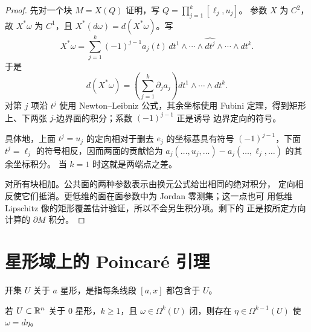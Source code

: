 \begin{proof}
先对一个块 $M=X(Q)$ 证明，写 $Q=\prod_{j=1}^k[\ell_j,u_j]$。
参数 $X$ 为 $C^2$，故 $X^*\omega$ 为
$C^1$，且 $X^*(d\omega)=d(X^*\omega)$。写
\[
 X^*\omega=\sum_{j=1}^k(-1)^{j-1}a_j(t)\,
 dt^1\wedge\cdots\wedge\widehat{dt^j}\wedge\cdots\wedge dt^k.
\]
于是
\[
 d(X^*\omega)=\left(\sum_{j=1}^k\partial_ja_j\right)
 dt^1\wedge\cdots\wedge dt^k.
\]
对第 $j$ 项沿 $t^j$ 使用 Newton--Leibniz 公式，其余坐标使用 Fubini
定理，得到矩形上、下两张 $j$-边界面的积分；系数 $(-1)^{j-1}$ 正是诱导
边界定向的符号。

具体地，上面 $t^j=u_j$ 的定向相对于删去 $e_j$ 的坐标基具有符号
$(-1)^{j-1}$，下面 $t^j=\ell_j$ 的符号相反，因而两面的贡献恰为
$a_j(\ldots,u_j,\ldots)-a_j(\ldots,\ell_j,\ldots)$ 的其余坐标积分。
当 $k=1$ 时这就是两端点之差。

对所有块相加。公共面的两种参数表示由换元公式给出相同的绝对积分，
定向相反使它们抵消。更低维的面在面参数中为 Jordan 零测集；这一点也可
用低维 Lipschitz 像的矩形覆盖估计验证，所以不会另生积分项。剩下的
正是按所定方向计算的 $\partial M$ 积分。
\end{proof}

\section{星形域上的 Poincaré 引理}

开集 $U$ 关于 $a$ 星形，是指每条线段 $[a,x]$ 都包含于 $U$。

\begin{theorem}[Poincaré 引理]
\label{thm:poincare-lemma-star-shaped}
若 $U\subset\mathbb{R}^n$ 关于 $0$ 星形，$k\ge1$，且
$\omega\in\Omega^k(U)$ 闭，则存在 $\eta\in\Omega^{k-1}(U)$ 使
$\omega=d\eta$。
\end{theorem}

